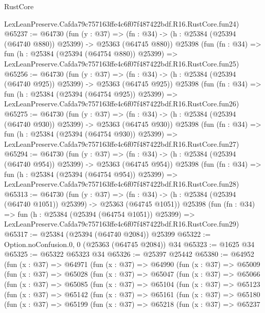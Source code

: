 \begin{lexlean}{RustCore}
\begin{coremodule}
    LexLeanPreserve.Cafda79c757163ffe4c6f07f487422bdf.R16.RustCore.fun24)
@65237 := @64730
    (fun (y : @37) =>
    (fn : @34) -> (h : @25384 (@25394 (@64740 @880)) @25399) -> @25363 (@64745 @880))
    @25398
    (fun (fn : @34) =>
    fun (h : @25384 (@25394 (@64754 @880)) @25399) =>
    LexLeanPreserve.Cafda79c757163ffe4c6f07f487422bdf.R16.RustCore.fun25)
@65256 := @64730
    (fun (y : @37) =>
    (fn : @34) -> (h : @25384 (@25394 (@64740 @925)) @25399) -> @25363 (@64745 @925))
    @25398
    (fun (fn : @34) =>
    fun (h : @25384 (@25394 (@64754 @925)) @25399) =>
    LexLeanPreserve.Cafda79c757163ffe4c6f07f487422bdf.R16.RustCore.fun26)
@65275 := @64730
    (fun (y : @37) =>
    (fn : @34) -> (h : @25384 (@25394 (@64740 @930)) @25399) -> @25363 (@64745 @930))
    @25398
    (fun (fn : @34) =>
    fun (h : @25384 (@25394 (@64754 @930)) @25399) =>
    LexLeanPreserve.Cafda79c757163ffe4c6f07f487422bdf.R16.RustCore.fun27)
@65294 := @64730
    (fun (y : @37) =>
    (fn : @34) -> (h : @25384 (@25394 (@64740 @954)) @25399) -> @25363 (@64745 @954))
    @25398
    (fun (fn : @34) =>
    fun (h : @25384 (@25394 (@64754 @954)) @25399) =>
    LexLeanPreserve.Cafda79c757163ffe4c6f07f487422bdf.R16.RustCore.fun28)
@65313 := @64730
    (fun (y : @37) =>
    (fn : @34) -> (h : @25384 (@25394 (@64740 @1051)) @25399) -> @25363 (@64745 @1051))
    @25398
    (fun (fn : @34) =>
    fun (h : @25384 (@25394 (@64754 @1051)) @25399) =>
    LexLeanPreserve.Cafda79c757163ffe4c6f07f487422bdf.R16.RustCore.fun29)
@65317 := @25384 (@25394 (@64740 @2084)) @25399
@65322 := Option.noConfusion.{0, 0} (@25363 (@64745 @2084)) @34
@65323 := @1625 @34
@65325 := @65322 @65323 @34
@65326 := @25397 @25442
@65380 := @64952
    (fun (x : @37) =>
    @64971
      (fun (x : @37) =>
      @64990
        (fun (x : @37) =>
        @65009
          (fun (x : @37) =>
          @65028
            (fun (x : @37) =>
            @65047
              (fun (x : @37) =>
              @65066
                (fun (x : @37) =>
                @65085
                  (fun (x : @37) =>
                  @65104
                    (fun (x : @37) =>
                    @65123
                      (fun (x : @37) =>
                      @65142
                        (fun (x : @37) =>
                        @65161
                          (fun (x : @37) =>
                          @65180
                            (fun (x : @37) =>
                            @65199
                              (fun (x : @37) =>
                              @65218
                                (fun (x : @37) =>
                                @65237

\end{coremodule}
\end{lexlean}

